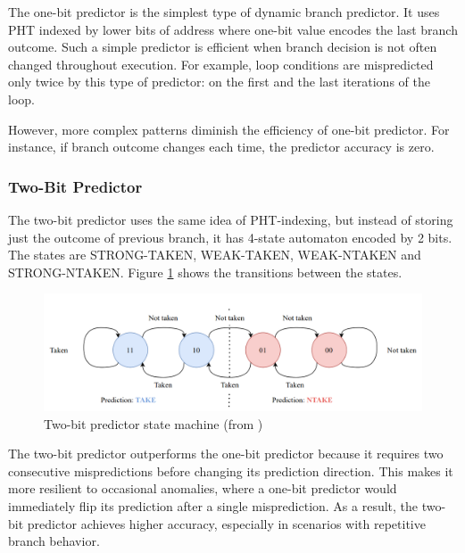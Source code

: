 The one-bit predictor is the simplest type of dynamic branch predictor. It uses PHT indexed by lower bits of address where one-bit value encodes the last branch outcome. Such a simple predictor is efficient when branch decision is not often changed throughout execution. For example, loop conditions are mispredicted only twice by this type of predictor: on the first and the last iterations of the loop.

However, more complex patterns diminish the efficiency of one-bit predictor. For instance, if branch outcome changes each time, the predictor accuracy is zero.

\subsubsection{Two-Bit Predictor}

The two-bit predictor uses the same idea of PHT-indexing, but instead of storing just the outcome of previous branch, it has 4-state automaton encoded by 2 bits. The states are STRONG-TAKEN, WEAK-TAKEN, WEAK-NTAKEN and STRONG-NTAKEN. Figure \ref{fig:two-bit-counter} shows the transitions between the states.

\begin{figure}[H]
    \includegraphics[width=\textwidth]{figures/two-bit-counter.png}
    \caption{Two-bit predictor state machine (from \cite{mahling_reverse_2023})}
    \label{fig:two-bit-counter}
\end{figure}

The two-bit predictor outperforms the one-bit predictor because it requires two consecutive mispredictions before changing its prediction direction. This makes it more resilient to occasional anomalies, where a one-bit predictor would immediately flip its prediction after a single misprediction. As a result, the two-bit predictor achieves higher accuracy, especially in scenarios with repetitive branch behavior.


